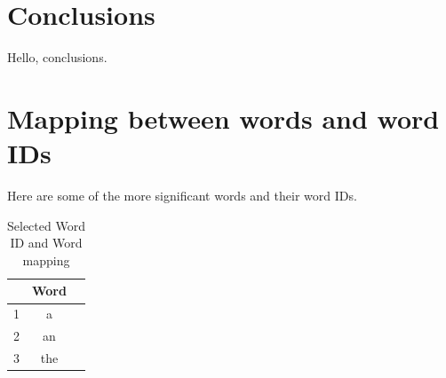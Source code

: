 \documentclass{IEEEtran}
\begin{document}
\section{Conclusions}
Hello, conclusions.

\printbibliography

\newpage
\onecolumn
\appendix
\section{Mapping between words and word IDs}
Here are some of the more significant words and their word IDs.

\begin{table}[ht]
  \caption{Selected Word ID and Word mapping}
  \centering
  \begin{tabular}{c c c }
  \hline\hline
                &         Word \\ [0.5ex]
  \hline
              1 &            a \\
              2 &           an \\ [1ex]
              3 &          the \\ [1ex]
  \hline
  \end{tabular}
  \label{table:nonlin}
\end{table}
\end{document}
